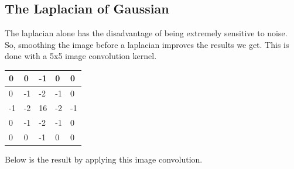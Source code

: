 \subsection{The Laplacian of Gaussian}
The laplacian alone has the disadvantage of being extremely sensitive to noise. So, smoothing the image before a laplacian improves the results we get. This is done with a 5x5 image convolution kernel.
\begin{table}[!htbp]
	\centering
	\begin{tabular}{|l|l|l|l|l|}
		\hline
		0  & 0  & -1 & 0  & 0  \\ \hline
		0  & -1 & -2 & -1 & 0  \\ \hline
		-1 & -2 & 16 & -2 & -1 \\ \hline
		0  & -1 & -2 & -1 & 0  \\ \hline
		0  & 0  & -1 & 0  & 0  \\ \hline
	\end{tabular}
\end{table}

Below is the result by applying this image convolution.
\begin{figure}[H]
	\centering
\end{figure}

